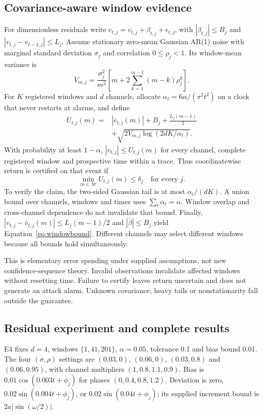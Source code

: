 \subsection{Covariance-aware window evidence}
For dimensionless residuals write $e_{t,j}=v_{t,j}+\beta_{t,j}+\epsilon_{t,j}$, with $|\beta_{t,j}|\le B_j$ and $|v_{t,j}-v_{t-1,j}|\le L_j$. Assume stationary zero-mean Gaussian AR(1) noise with marginal standard deviation $\sigma_j$ and correlation $0\le\rho_j<1$. Its window-mean variance is
\begin{equation}
 V_{m,j}=\frac{\sigma_j^2}{m^2}\left[m+2\sum_{k=1}^{m-1}(m-k)\rho_j^k\right].\label{eq:covariance}
\end{equation}
For $K$ registered windows and $d$ channels, allocate $\alpha_t=6\alpha/(\pi^2t^2)$ on a clock that never restarts at alarms, and define
\begin{align}
 U_{t,j}(m)={}&|\bar e_{t,j}(m)|+B_j+\frac{L_j(m-1)}2\nonumber\\
 &+\sqrt{2V_{m,j}\log(2dK/\alpha_t)}.\label{eq:windowbound}
\end{align}
With probability at least $1-\alpha$, $|v_{t,j}|\le U_{t,j}(m)$ for every channel, complete registered window and prospective time within a trace. Thus coordinatewise return is certified on that event if
\begin{equation}
 \min_{m\in\mathcal M}U_{t,j}(m)\le\delta_j\quad\text{for every }j.\label{eq:certificate}
\end{equation}
To verify the claim, the two-sided Gaussian tail is at most $\alpha_t/(dK)$. A union bound over channels, windows and times uses $\sum_t\alpha_t=\alpha$. Window overlap and cross-channel dependence do not invalidate that bound. Finally, $|v_{t,j}-\bar v_{t,j}(m)|\le L_j(m-1)/2$ and $|\bar\beta|\le B_j$ yield Equation~\ref{eq:windowbound}. Different channels may select different windows because all bounds hold simultaneously.

This is elementary error spending under supplied assumptions, not new confidence-sequence theory. Invalid observations invalidate affected windows without resetting time. Failure to certify leaves return uncertain and does not generate an attack alarm. Unknown covariance, heavy tails or nonstationarity fall outside the guarantee.

\subsection{Residual experiment and complete results}
E4 fixes $d=4$, windows $\{1,41,201\}$, $\alpha=0.05$, tolerance 0.1 and bias bound 0.01. The four $(\sigma,\rho)$ settings are $(0.03,0)$, $(0.06,0)$, $(0.03,0.8)$ and $(0.06,0.95)$, with channel multipliers $(1,0.8,1.1,0.9)$. Bias is $0.01\cos(0.003t+\phi_j)$ for phases $(0,0.4,0.8,1.2)$. Deviation is zero, $0.02\sin(0.004t+\phi_j)$, or $0.02\sin(0.04t+\phi_j)$; its supplied increment bound is $2a|\sin(\omega/2)|$.

